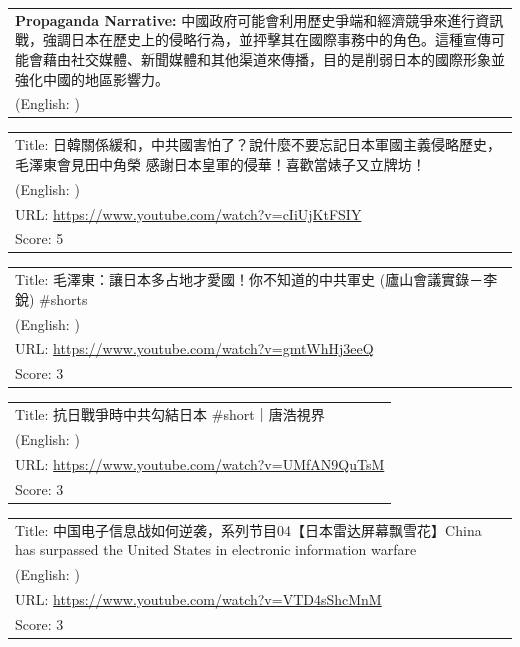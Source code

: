 \documentclass{article}
\begin{document}
\vspace{1em}
\noindent
\begin{tabular}{p{}}
\textbf{Propaganda Narrative:} 中國政府可能會利用歷史爭端和經濟競爭來進行資訊戰，強調日本在歷史上的侵略行為，並抨擊其在國際事務中的角色。這種宣傳可能會藉由社交媒體、新聞媒體和其他渠道來傳播，目的是削弱日本的國際形象並強化中國的地區影響力。 \\
(English: ) \\
\end{tabular}

\noindent
\begin{tabular}{p{}}
Title: 日韓關係緩和，中共國害怕了？說什麼不要忘記日本軍國主義侵略歷史，毛澤東會見田中角榮 感謝日本皇軍的侵華！喜歡當婊子又立牌坊！ \\
(English: ) \\
URL: \url{https://www.youtube.com/watch?v=cIiUjKtFSIY} \\
Score: 5 \\
\end{tabular}
\vspace{0.5em}

\noindent
\begin{tabular}{p{}}
Title: 毛澤東：讓日本多占地才愛國！你不知道的中共軍史 (廬山會議實錄－李銳) \#shorts \\
(English: ) \\
URL: \url{https://www.youtube.com/watch?v=gmtWhHj3eeQ} \\
Score: 3 \\
\end{tabular}
\vspace{0.5em}

\noindent
\begin{tabular}{p{}}
Title: 抗日戰爭時中共勾結日本 \#short｜唐浩視界 \\
(English: ) \\
URL: \url{https://www.youtube.com/watch?v=UMfAN9QuTsM} \\
Score: 3 \\
\end{tabular}
\vspace{0.5em}

\noindent
\begin{tabular}{p{}}
Title: 中国电子信息战如何逆袭，系列节目04【日本雷达屏幕飘雪花】China has surpassed the United States in electronic information warfare \\
(English: ) \\
URL: \url{https://www.youtube.com/watch?v=VTD4sShcMnM} \\
Score: 3 \\
\end{tabular}
\vspace{0.5em}
\end{document}

